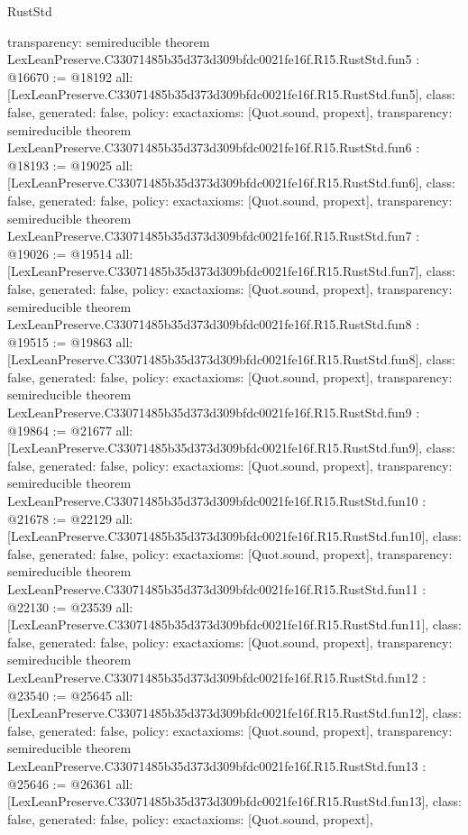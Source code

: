 \begin{lexlean}{RustStd}
\begin{coremodule}
{  transparency: semireducible
}
theorem LexLeanPreserve.C33071485b35d373d309bfdc0021fe16f.R15.RustStd.fun5 : @16670 := @18192 {
  all: [LexLeanPreserve.C33071485b35d373d309bfdc0021fe16f.R15.RustStd.fun5],
  class: false,
  generated: false,
  policy: exact{axioms: [Quot.sound, propext]},
  transparency: semireducible
}
theorem LexLeanPreserve.C33071485b35d373d309bfdc0021fe16f.R15.RustStd.fun6 : @18193 := @19025 {
  all: [LexLeanPreserve.C33071485b35d373d309bfdc0021fe16f.R15.RustStd.fun6],
  class: false,
  generated: false,
  policy: exact{axioms: [Quot.sound, propext]},
  transparency: semireducible
}
theorem LexLeanPreserve.C33071485b35d373d309bfdc0021fe16f.R15.RustStd.fun7 : @19026 := @19514 {
  all: [LexLeanPreserve.C33071485b35d373d309bfdc0021fe16f.R15.RustStd.fun7],
  class: false,
  generated: false,
  policy: exact{axioms: [Quot.sound, propext]},
  transparency: semireducible
}
theorem LexLeanPreserve.C33071485b35d373d309bfdc0021fe16f.R15.RustStd.fun8 : @19515 := @19863 {
  all: [LexLeanPreserve.C33071485b35d373d309bfdc0021fe16f.R15.RustStd.fun8],
  class: false,
  generated: false,
  policy: exact{axioms: [Quot.sound, propext]},
  transparency: semireducible
}
theorem LexLeanPreserve.C33071485b35d373d309bfdc0021fe16f.R15.RustStd.fun9 : @19864 := @21677 {
  all: [LexLeanPreserve.C33071485b35d373d309bfdc0021fe16f.R15.RustStd.fun9],
  class: false,
  generated: false,
  policy: exact{axioms: [Quot.sound, propext]},
  transparency: semireducible
}
theorem LexLeanPreserve.C33071485b35d373d309bfdc0021fe16f.R15.RustStd.fun10 : @21678 := @22129 {
  all: [LexLeanPreserve.C33071485b35d373d309bfdc0021fe16f.R15.RustStd.fun10],
  class: false,
  generated: false,
  policy: exact{axioms: [Quot.sound, propext]},
  transparency: semireducible
}
theorem LexLeanPreserve.C33071485b35d373d309bfdc0021fe16f.R15.RustStd.fun11 : @22130 := @23539 {
  all: [LexLeanPreserve.C33071485b35d373d309bfdc0021fe16f.R15.RustStd.fun11],
  class: false,
  generated: false,
  policy: exact{axioms: [Quot.sound, propext]},
  transparency: semireducible
}
theorem LexLeanPreserve.C33071485b35d373d309bfdc0021fe16f.R15.RustStd.fun12 : @23540 := @25645 {
  all: [LexLeanPreserve.C33071485b35d373d309bfdc0021fe16f.R15.RustStd.fun12],
  class: false,
  generated: false,
  policy: exact{axioms: [Quot.sound, propext]},
  transparency: semireducible
}
theorem LexLeanPreserve.C33071485b35d373d309bfdc0021fe16f.R15.RustStd.fun13 : @25646 := @26361 {
  all: [LexLeanPreserve.C33071485b35d373d309bfdc0021fe16f.R15.RustStd.fun13],
  class: false,
  generated: false,
  policy: exact{axioms: [Quot.sound, propext]},
}
\end{coremodule}
\end{lexlean}
